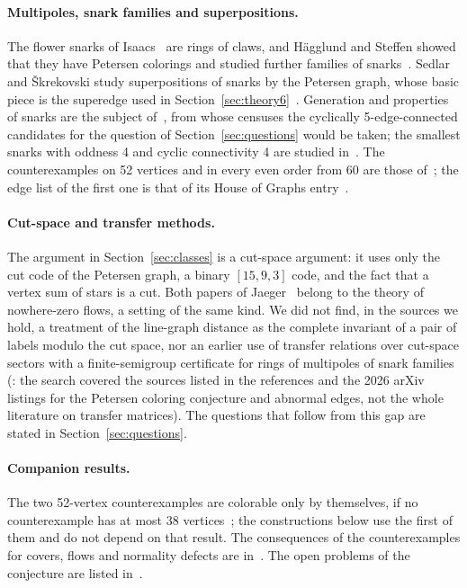 \paragraph{Multipoles, snark families and superpositions.} The flower snarks of Isaacs~\cite{Isaacs1975}
are rings of claws, and H\"agglund and Steffen showed that they have Petersen colorings and studied
further families of snarks~\cite{HS2014}. Sedlar and \v{S}krekovski study superpositions of snarks by
the Petersen graph, whose basic piece is the superedge used in
Section~\ref{sec:theory6}~\cite{SS2023}. Generation and properties of snarks are the subject
of~\cite{Brinkmann2013}, from whose censuses the cyclically 5-edge-connected candidates for the question
of Section~\ref{sec:questions} would be taken; the smallest snarks with oddness 4 and cyclic
connectivity 4 are studied in~\cite{GMS2019}. The counterexamples on 52 vertices and in every even order from 60 are those
of~\cite{GJMMMU2026}; the edge list of the first one is that of its House of Graphs entry~\cite{HoG2023}.

\paragraph{Cut-space and transfer methods.} The argument in Section~\ref{sec:classes}
is a cut-space argument: it uses only the cut code of the Petersen graph, a binary $[15,9,3]$ code, and
the fact that a vertex sum of stars is a cut. Both papers of Jaeger~\cite{Jaeger1988,Jaeger1985} belong to
the theory of nowhere-zero flows, a setting of the same kind. We did not find, in the sources we hold, a treatment of
the line-graph distance as the complete invariant of a pair of labels modulo the cut space, nor an earlier use of
transfer relations over cut-space sectors with a finite-semigroup certificate for rings of multipoles of
snark families (: the search covered the sources listed in the references and the 2026 arXiv listings
for the Petersen coloring conjecture and abnormal edges, not the whole literature on transfer matrices).
The questions that follow from this gap are stated in Section~\ref{sec:questions}.

\paragraph{Companion results.} The two 52-vertex counterexamples are colorable only by themselves, if no
counterexample has at most 38 vertices~\cite{COBI2026}; the constructions below use the first of them and
do not depend on that result. The consequences of the counterexamples for covers, flows and normality
defects are in~\cite{Audit2026}. The open problems of the conjecture are listed in~\cite{OPG}.
